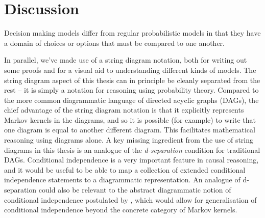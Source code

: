 

\chapter{Discussion}\label{ch:discussion}

Decision making models differ from regular probabilistic models in that they have a domain of choices or options that must be compared to one another. 

In parallel, we've made use of a string diagram notation, both for writing out some proofs and for a visual aid to understanding different kinds of models. The string diagram aspect of this thesis can in principle be cleanly separated from the rest -- it is simply a notation for reasoning using probability theory. Compared to the more common diagrammatic language of directed acyclic graphs (DAGs), the chief advantage of the string diagram notation is that it explicitly represents Markov kernels in the diagrams, and so it is possible (for example) to write that one diagram is equal to another different diagram. This facilitates mathematical reasoning using diagrams alone. A key missing ingredient from the use of string diagrams in this thesis is an analogue of the \emph{d-separation} condition for traditional DAGs. Conditional independence is a very important feature in causal reasoning, and it would be useful to be able to map a collection of extended conditional independence statements to a diagrammatic representation. An analogue of d-separation could also be relevant to the abstract diagrammatic notion of conditional independence postulated by \citet{fritz_synthetic_2020}, which would allow for generalisation of conditional independence beyond the concrete category of Markov kernels.